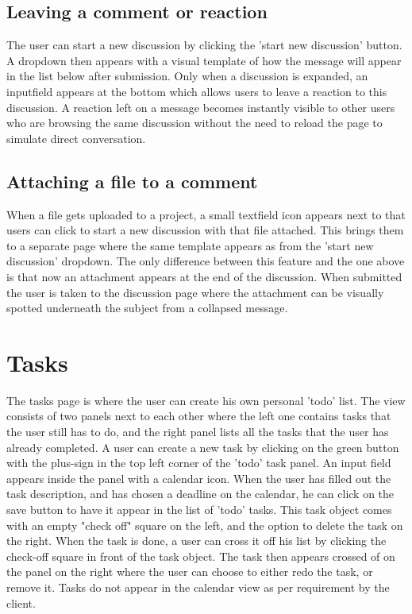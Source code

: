 \subsection{Leaving a comment or reaction}

The user can start a new discussion by clicking the 'start new discussion' button. A dropdown 
then appears with a visual template of how the message will appear in the list below after submission.  
Only when a discussion is expanded, an inputfield appears at the bottom which allows users to leave a reaction to this discussion. 
A reaction left on a message becomes instantly visible to other users who are browsing the same discussion without the need to reload the page to simulate direct conversation.

\subsection{Attaching a file to a comment}

When a file gets uploaded to a project, a small textfield icon appears next to that users can click to start
a new discussion with that file attached. This brings them to a separate page where the same template appears
as from the 'start new discussion' dropdown. The only difference between this feature and the one above is that now an attachment appears at the end of the discussion. 
When submitted the user is taken to the discussion page where the attachment can be visually spotted underneath the subject from a collapsed message.

\section{Tasks}

The tasks page is where the user can create his own personal 'todo' list. The view consists of two
panels next to each other where the left one contains tasks that the user still has to do,
and the right panel lists all the tasks that the user has already completed. A user can create
a new task by clicking on the green button with the plus-sign in the top left corner of the 'todo' task
panel. An input field appears inside the panel with a calendar icon. When the user has filled out
the task description, and has chosen a deadline on the calendar, he can click on the save button to have
it appear in the list of 'todo' tasks. This task object comes with an empty "check off" square on the left,
and the option to delete the task on the right. When the task is done, a user can cross it off his list by
clicking the check-off square in front of the task object. The task then appears crossed of on the panel on
the right where the user can choose to either redo the task, or remove it. Tasks do not appear in the calendar
view as per requirement by the client.

